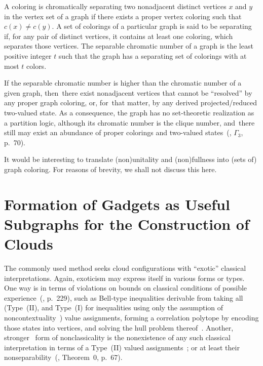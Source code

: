 A coloring is {chromatically separating} two nonadjacent distinct vertices $x$ and $y$ in the vertex set of a graph
if there exists a proper vertex coloring such that $c(x) \neq c(y)$.
A set of colorings of a particular graph is said to be {separating}
if, for any pair of distinct vertices, it contains at least one coloring, which separates those vertices.
The {separable chromatic number} of a graph is the least positive integer $t$ such
that the graph has a separating set of colorings with at most $t$ colors.

If the separable chromatic number is higher than the chromatic number of a given graph,
then~there exist nonadjacent vertices that cannot be ``resolved''
by any proper graph coloring, or, for~that matter, by any derived
projected/reduced two-valued state.
As a consequence, the graph has no set-theoretic realization as a partition logic,
although its chromatic number is the clique number,
and~there still may exist an abundance of proper colorings and two-valued states~(\cite{Kochen1}, $\Gamma_3$, p.~70).

It would be interesting to translate (non)unitality and (non)fullness into (sets of) graph coloring.
For reasons of brevity, we shall not discuss this here.



\section{Formation of Gadgets as Useful Subgraphs for the Construction of Clouds}

The commonly used method seeks cloud configurations with ``exotic'' classical interpretations.
Again, exoticism may express itself in various forms or types.
One way is in terms of violations on bounds on classical {conditions of possible experience}~(\cite{Boole-62}, p.~229),
such as Bell-type inequalities derivable from taking all (Type~(II),
and Type~(I) for inequalities using only the assumption of noncontextuality~\cite{cabello:210401}) value assignments,
forming a correlation polytope by encoding those states into vertices, and solving the hull problem
thereof~\cite{froissart-81,cirelson,pitowsky-86,pitowsky,pitowsky-89a,Pit-91,Pit-94,2000-poly}.
Another, stronger~\cite{svozil-2011-enough} form of nonclassicality is the nonexistence
of any such classical interpretation in terms of a Type~(II) valued
assignments~\cite{Gleason,Specker-60,Zierler1975,Kochen1,pitowsky:218};
or at least their nonseparability~(\cite{Kochen1}, Theorem~0, p.~67).

